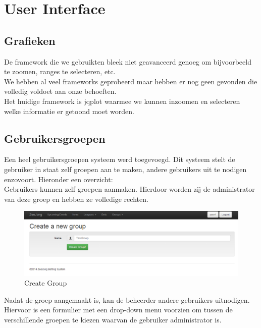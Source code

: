\documentclass[11pt]{article}
\begin{document}
\section{User Interface}


\subsection{Grafieken}

De framework die we gebruikten bleek niet geavanceerd genoeg om bijvoorbeeld te zoomen, ranges te selecteren, etc.\\
We hebben al veel frameworks geprobeerd maar hebben er nog geen gevonden die volledig voldoet aan onze behoeften.\\
Het huidige framework is jqplot waarmee we kunnen inzoomen en selecteren welke informatie er getoond moet worden.



\subsection{Gebruikersgroepen}

Een heel gebruikersgroepen systeem werd toegevoegd.  Dit systeem stelt de gebruiker in staat zelf groepen aan te maken, andere gebruikers uit te nodigen enzovoort.  Hieronder een overzicht:\\

Gebruikers kunnen zelf groepen aanmaken.  Hierdoor worden zij de administrator van deze groep en hebben ze volledige rechten.\\

\begin{figure}[h!]
	\begin{center}
	\includegraphics[scale=0.4]{createGroup.png}

	\caption{Create Group}
	\label{fig:createGroup}
	\end{center}
\end{figure}

Nadat de groep aangemaakt is, kan de beheerder andere gebruikers uitnodigen.  Hiervoor is een formulier met een drop-down menu voorzien om tussen de verschillende groepen te kiezen waarvan de gebruiker administrator is.\\
\end{document}
